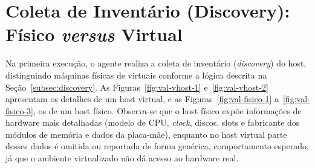 \documentclass[
    12pt
    ,oneside
    ,a4paper
    ,chapter=TITLE
    ,section=TITLE
    ,sumario=abnt-6027-2012]{abntex2}
\begin{document}
\begin{figure}[H]
\end{figure}

\begin{figure}[H]
\end{figure}

\section{Coleta de Inventário (Discovery): Físico \textit{versus} Virtual}
\label{sec:valid-discovery}

Na primeira execução, o agente realiza a coleta de inventário (\textit{discovery}) do host, distinguindo máquinas físicas de virtuais conforme a lógica descrita na Seção~\ref{subsec:discovery}. As Figuras~\ref{fig:val-vhost-1} e~\ref{fig:val-vhost-2} apresentam os detalhes de um host virtual, e as Figuras~\ref{fig:val-fisico-1} a~\ref{fig:val-fisico-3}, os de um host físico. Observa-se que o host físico expõe informações de hardware mais detalhadas (modelo de CPU, \textit{clock}, discos, slots e fabricante dos módulos de memória e dados da placa-mãe), enquanto no host virtual parte desses dados é omitida ou reportada de forma genérica, comportamento esperado, já que o ambiente virtualizado não dá acesso ao hardware real.

\begin{figure}[H]
\end{figure}

\begin{figure}[H]
\end{figure}

\begin{figure}[H]
\end{figure}
\end{document}
